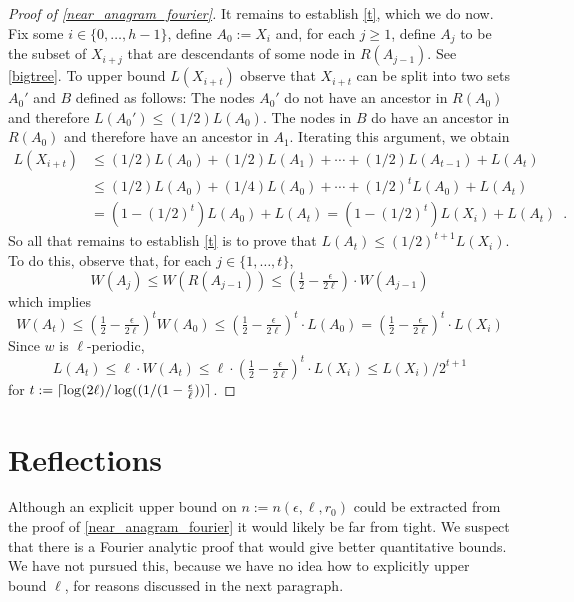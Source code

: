 \documentclass{patmorin}
\begin{document}
\begin{proof}[Proof of \cref{near_anagram_fourier}]
  It remains to establish \cref{t}, which we do now.  Fix some $i\in\{0,\ldots,h-1\}$, define $A_0:= X_i$ and, for each $j\ge 1$, define $A_j$ to be the subset of $X_{i+j}$ that are descendants of some node in $R(A_{j-1})$.  See \cref{bigtree}.  To upper bound $L(X_{i+t})$ observe that $X_{i+t}$ can be split into two sets $A_0'$ and $B$ defined as follows:  The nodes $A_0'$ do not have an ancestor in $R(A_0)$ and therefore $L(A_0')\le (1/2)L(A_0)$. The nodes in $B$ do have an ancestor in $R(A_0)$ and therefore have an ancestor in $A_1$.  Iterating this argument, we obtain
 \begin{align*}
      L(X_{i+t})
         &\le (1/2)L(A_0) + (1/2)L(A_1) + \cdots + (1/2)L(A_{t-1}) + L(A_t) \\
         &\le (1/2)L(A_0) + (1/4)L(A_0) + \cdots + (1/2)^t L(A_{0}) + L(A_t) \\
         &  = (1-(1/2)^t)L(A_0) + L(A_t) = (1-(1/2)^t)L(X_i) + L(A_t)  \enspace .
   \end{align*}
  So all that remains to establish \ref{t} is to prove that
  $L(A_t)\le (1/2)^{t+1}L(X_i)$.  To do this, observe that, for each $j\in\{1,\ldots,t\}$,
  \begin{equation}
      W(A_j)
        \le W(R(A_{j-1}))
        \le (\tfrac12-\tfrac{\epsilon}{2\ell})\cdot W(A_{j-1})
  \end{equation}
  which implies
  \[
       W(A_t)
       \le (\tfrac12-\tfrac{\epsilon}{2\ell})^t W(A_0) \le (\tfrac12-\tfrac{\epsilon}{2\ell})^t\cdot L(A_0)
       =  (\tfrac12-\tfrac{\epsilon}{2\ell})^t\cdot L(X_i)
  \]
  Since $w$ is $\ell$-periodic,
  \[
        L(A_t)\le \ell\cdot W(A_t) \le \ell\cdot(\tfrac12-\tfrac{\epsilon}{2\ell})^t\cdot L(X_i) \le L(X_i)/2^{t+1}
  \]
  for $t := {\lceil \log(2\ell)/\log((1/(1-\tfrac{\epsilon}{\ell})) \rceil}$.
\end{proof}

\section{Reflections}
\label{reflections}

Although an explicit upper bound on $n:=n(\epsilon,\ell,r_0)$ could be extracted from the proof of \cref{near_anagram_fourier} it would likely be far from tight.  We suspect that there is a Fourier analytic proof that would give better quantitative bounds.  We have not pursued this, because we have no idea how to explicitly upper bound $\ell$, for reasons discussed in the next paragraph.
\end{document}
